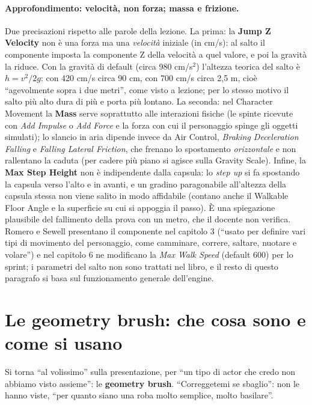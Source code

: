 \paragraph{Approfondimento: velocità, non forza; massa e frizione.} Due precisazioni
rispetto alle parole della lezione. La prima: la \textbf{Jump Z Velocity} non è una forza
ma una \emph{velocità} iniziale (in cm/s): al salto il componente imposta la componente Z
della velocità a quel valore, e poi la gravità la riduce. Con la gravità di default
(circa 980 cm/s$^2$) l'altezza teorica del salto è $h = v^2 / 2g$: con 420 cm/s circa
90 cm, con 700 cm/s circa 2,5 m, cioè ``agevolmente sopra i due metri'', come visto a
lezione; per lo stesso motivo il salto più alto dura di più e porta più lontano. La
seconda: nel Character Movement la \textbf{Mass} serve soprattutto alle interazioni
fisiche (le spinte ricevute con \emph{Add Impulse} o \emph{Add Force} e la forza con cui il
personaggio spinge gli oggetti simulati); lo slancio in aria dipende invece da Air
Control, \emph{Braking Deceleration Falling} e \emph{Falling Lateral Friction}, che
frenano lo spostamento \emph{orizzontale} e non rallentano la caduta (per cadere più piano
si agisce sulla Gravity Scale). Infine, la \textbf{Max Step Height} non è indipendente dalla
capsula: lo \emph{step up} si fa spostando la capsula verso l'alto e in avanti, e un
gradino paragonabile all'altezza della capsula stessa non viene salito in modo affidabile
(contano anche il Walkable Floor Angle e la superficie su cui si appoggia il passo). È una
spiegazione plausibile del fallimento della prova con un metro, che il docente non
verifica. Romero e Sewell presentano il componente
nel capitolo 3 (``usato per definire vari tipi di movimento del personaggio, come camminare,
correre, saltare, nuotare e volare'') e nel capitolo 6 ne modificano la \emph{Max Walk Speed}
(default 600) per lo sprint; i parametri del salto non sono trattati nel libro, e il resto
di questo paragrafo si basa sul funzionamento generale dell'engine.

\section{Le geometry brush: che cosa sono e come si usano}
\label{ue13:sec:brush}

Si torna ``al volissimo'' sulla presentazione, per ``un tipo di actor che credo non abbiamo
visto assieme'': le \textbf{geometry brush}. ``Correggetemi se sbaglio'': non le hanno
viste, ``per quanto siano una roba molto semplice, molto basilare''.

